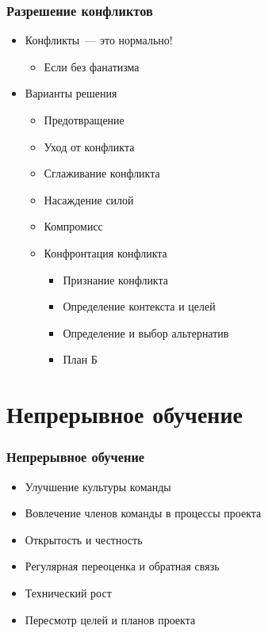\documentclass{../../slides-style}
\begin{document}
    \begin{frame}
        \frametitle{Разрешение конфликтов}
        \begin{itemize}
            \item Конфликты~--- это нормально!
            \begin{itemize}
                \item Если без фанатизма
            \end{itemize}
            \item Варианты решения
            \begin{itemize}
                \item Предотвращение
                \item Уход от конфликта
                \item Сглаживание конфликта
                \item Насаждение силой
                \item Компромисс
                \item Конфронтация конфликта
                \begin{itemize}
                    \item Признание конфликта
                    \item Определение контекста и целей
                    \item Определение и выбор альтернатив
                    \item План Б
                \end{itemize}
            \end{itemize}
        \end{itemize}
    \end{frame}

    \section{Непрерывное обучение}

    \begin{frame}
        \frametitle{Непрерывное обучение}
        \begin{itemize}
            \item Улучшение культуры команды
            \item Вовлечение членов команды в процессы проекта
            \item Открытость и честность
            \item Регулярная переоценка и обратная связь
            \item Технический рост
            \item Пересмотр целей и планов проекта
        \end{itemize}
    \end{frame}
\end{document}
